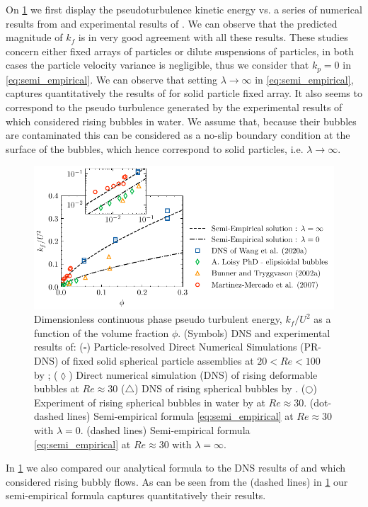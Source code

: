 On \ref{fig:trygvason} we first display the pseudoturbulence kinetic energy vs. a series of numerical results from \citet{bunner2002dynamics,loisy2016direct,wang2021numerical} and experimental results of \citet{martinez2007measurement}.  
We can observe that the predicted magnitude of $k_f$ is in very good agreement with all these results. 
These studies concern either fixed arrays of particles or dilute suspensions of particles, in both cases the particle velocity variance is negligible, thus we consider that $k_p = 0$ in \ref{eq:semi_empirical}. 
We can observe that setting $\lambda \to\infty$ in \ref{eq:semi_empirical}, captures quantitatively the results of \citet{wang2021numerical} for solid particle fixed array. 
It also seems to correspond to the pseudo turbulence generated by the experimental results of \citet{martinez2007measurement} which considered rising bubbles in water. 
We assume that, because their bubbles are contaminated this can be considered as a no-slip boundary condition at the surface of the bubbles, which hence correspond to solid particles, i.e. $\lambda \to \infty$.  
\begin{figure}
    \centering
    \includegraphics[height = 0.35\textwidth]{image/HOMOGENEOUS_final/CA/KFliterature.pdf}
    \caption{Dimensionless continuous phase pseudo turbulent energy, $k_f/U^2$ as a function of the volume fraction $\phi$.
    (Symbols) DNS and experimental results of: 
    ($\pmb\square$)  Particle-resolved Direct Numerical Simulations (PR-DNS)
    of fixed solid spherical particle assemblies at $20< Re < 100$  by \citet{wang2021numerical}; 
    ($\pmb\lozenge$) Direct numerical simulation (DNS) of rising deformable bubbles at $Re \approx 30$ \citep{loisy2016direct}
    ($\pmb\triangle$) DNS of rising spherical bubbles by \citet{bunner2002dynamics}. 
    ($\pmb\bigcirc$) Experiment of rising spherical bubbles in water by \citet{martinez2007measurement} at $Re \approx 30$. 
    (dot-dashed lines) Semi-empirical formula \ref{eq:semi_empirical} at $Re \approx 30$ with $\lambda = 0$. 
    (dashed lines)  Semi-empirical formula \ref{eq:semi_empirical} at $Re \approx 30$ with $\lambda = \infty$.
    }
    \label{fig:trygvason}
\end{figure}
In \ref{fig:trygvason} we also compared our analytical formula to the DNS results of \citet{bunner2002dynamics} and \citet{loisy2016direct} which considered rising bubbly flows. 
As can be seen from the (dashed lines) in \ref{fig:trygvason} our semi-empirical formula captures quantitatively their results. 

